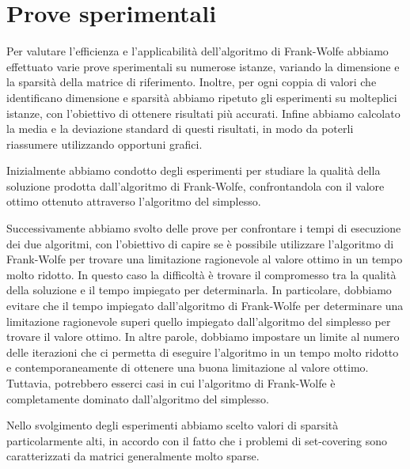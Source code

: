 \section{Prove sperimentali}
Per valutare l'efficienza e l'applicabilità dell'algoritmo di Frank-Wolfe abbiamo effettuato varie prove sperimentali su
numerose istanze, variando la dimensione e la sparsità della matrice di riferimento. Inoltre, per ogni coppia di valori
che identificano dimensione e sparsità abbiamo ripetuto gli esperimenti su molteplici istanze, con l'obiettivo di
ottenere risultati più accurati. Infine abbiamo calcolato la media e la deviazione standard di questi risultati, in modo
da poterli riassumere utilizzando opportuni grafici.

Inizialmente abbiamo condotto degli esperimenti per studiare la qualità della soluzione prodotta dall'algoritmo di
Frank-Wolfe, confrontandola con il valore ottimo ottenuto attraverso l'algoritmo del simplesso.

Successivamente abbiamo svolto delle prove per confrontare i tempi di esecuzione dei due algoritmi, con l'obiettivo di
capire se è possibile utilizzare l'algoritmo di Frank-Wolfe per trovare una limitazione ragionevole al valore ottimo in
un tempo molto ridotto. In questo caso la difficoltà è trovare il compromesso tra la qualità della soluzione e il tempo
impiegato per determinarla. In particolare, dobbiamo evitare che il tempo impiegato dall'algoritmo di Frank-Wolfe per
determinare una limitazione ragionevole superi quello impiegato dall'algoritmo del simplesso per trovare il valore
ottimo. In altre parole, dobbiamo impostare un limite al numero delle iterazioni che ci permetta di eseguire l'algoritmo
in un tempo molto ridotto e contemporaneamente di ottenere una buona limitazione al valore ottimo. Tuttavia, potrebbero
esserci casi in cui l'algoritmo di Frank-Wolfe è completamente dominato dall'algoritmo del simplesso.

Nello svolgimento degli esperimenti abbiamo scelto valori di sparsità particolarmente alti, in accordo con il fatto che
i problemi di set-covering sono caratterizzati da matrici generalmente molto sparse.

